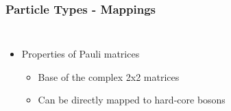     \begin{frame}[t]
        \frametitle{Particle Types - Mappings}
        
        \begin{columns}[t]
                \begin{itemize}
                    \item Properties of Pauli matrices \pause
                    \begin{itemize}
                        \item Base of the complex 2x2 matrices \pause
                        \item Can be directly mapped to hard-core bosons
                    \end{itemize}
                \end{itemize}
    
            \onslide
                \vspace{-0.5cm}
                \pause[3]
                \vspace{0.1cm}
    
        \end{columns}

        \onslide %
    \end{frame}

